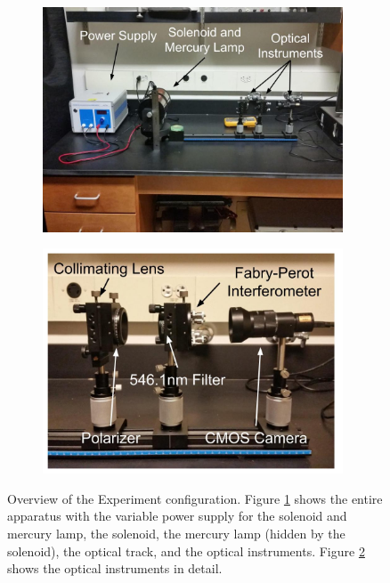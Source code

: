 \documentclass[twocolumn]{article}
\begin{document}
	\begin{figure}
		\centering
		\begin{subfigure}{0.5\textwidth}
			\includegraphics[width = 0.98\textwidth]{Images/ExperimentOverview.jpg}
			\caption{}
			\label{subfig:Overview}
			
		\end{subfigure}%
		\begin{subfigure}{0.5\textwidth}
				\includegraphics[width = 0.98\textwidth]{Images/OpticsRail.jpg}
				\caption{}
				\label{subfig:OpticsRail}
				
		\end{subfigure}%
		\caption{Overview of the Experiment configuration. Figure \ref{subfig:Overview} shows the entire apparatus with the variable power supply for the solenoid and mercury lamp, the solenoid, the mercury lamp (hidden by the solenoid), the optical track, and the optical instruments. Figure \ref{subfig:OpticsRail} shows the optical instruments in detail.}
		\label{fig:ContextView}
	\end{figure}
	
\end{document}
